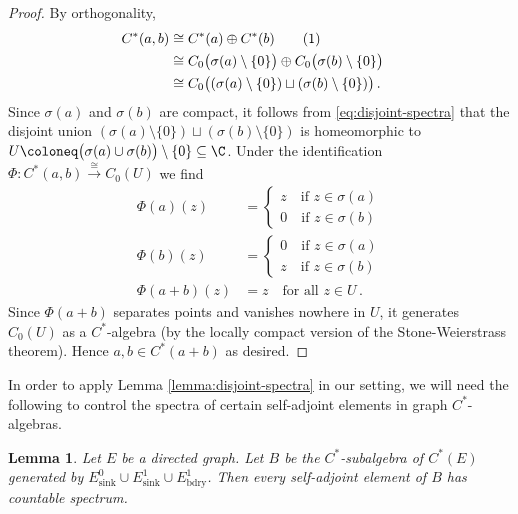 \documentclass[12pt, a4paper]
{amsart}
\newcommand\numberthis{\addtocounter{equation}{1}\tag{\theequation}}
\newtheorem{lemma}[thm]{Lemma}
\theoremstyle{definition}
\theoremstyle{remark}
\numberwithin{equation}{section}
\newcommand{\Esink}{E^0_{\mathrm{sink}}}
\newcommand{\edgesink}{E^1_{\mathrm{sink}}}
\newcommand{\edgebdy}{E^1_{\mathrm{bdry}}}
\newcommand{\Cstar}{\ensuremath{C^*}}
\begin{document}
\begin{proof}
    By orthogonality, 
    \begin{align*}
        \Cstar(a,b)&\cong \Cstar(a)\oplus\Cstar(b)\numberthis\\
        &\cong C_0\big(\sigma(a)\setminus \{0\}\big)\oplus C_0\big(\sigma(b)\setminus \{0\}\big) \quad\\
        &\cong C_0\big( (\sigma(a) \setminus \{0\}) \sqcup (\sigma(b) \setminus \{0\} )\big)\,.
    \end{align*}
    Since $\sigma(a)$ and $\sigma(b)$ are compact, it follows from \eqref{eq:disjoint-spectra} that the disjoint union $(\sigma(a) \setminus \{0\}) \sqcup (\sigma(b) \setminus \{0\} )$ is homeomorphic to $U \coloneq \big(\sigma(a)  \cup \sigma(b)\big) \setminus \{0\} \subseteq \C$. Under the identification $\Phi \colon C^*(a,b) \xrightarrow{\cong} C_0(U)$ we find
    \begin{align}
        \Phi(a)(z)&=\begin{cases}
            z\quad\text{if }z\in\sigma(a)\\
            0\quad\text{if }z\in \sigma(b)
        \end{cases}\\
        \Phi(b)(z)&=\begin{cases}
            0\quad\text{if }z\in\sigma(a)\\
            z\quad\text{if }z\in \sigma(b)
        \end{cases}\\
        \Phi(a+b)(z)&=z \quad \text{for all } z \in U\,.
    \end{align}
    Since $\Phi(a+b)$ separates points and vanishes nowhere in $U$, it generates $C_0(U)$ as a $C^*$-algebra (by the locally compact version of the Stone-Weierstrass theorem). Hence $a,b \in C^*(a+b)$ as desired.
\end{proof}

In order to apply Lemma \ref{lemma:disjoint-spectra} in our setting, we will need the following to control the spectra of certain self-adjoint elements in graph \Cstar-algebras.

\begin{lemma}
\label{lemma:countable-spectrum}
    Let $E$ be a directed graph.
    Let $B$ be the $C^*$-subalgebra of $C^*(E)$ generated by $\Esink \cup \edgesink \cup \edgebdy$.
    Then every self-adjoint element of $B$ has countable spectrum.
\end{lemma}
\end{document}
